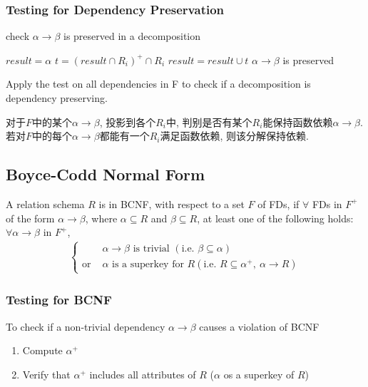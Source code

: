 \subsubsection{Testing for Dependency Preservation}

\begin{algorithm}[H]
    \caption{check $\alpha \rightarrow \beta$ is preserved in a decomposition}
    \begin{algorithmic}
        \State $result=\alpha$
                \State $t=(result\cap R_i)^+ \cap R_i$
            \EndFor
            \State $result=result\cup t$
                \State $\alpha \rightarrow \beta$ is preserved
            \EndIf
        \EndWhile
    \end{algorithmic}
\end{algorithm}
Apply the test on all dependencies in F to check if a decomposition is dependency preserving.


对于$F$中的某个$\alpha\rightarrow\beta$, 投影到各个$R_i$中, 判别是否有某个$R_i$能保持函数依赖$\alpha\rightarrow\beta$. 若对$F$中的每个$\alpha\rightarrow\beta$都能有一个$R_i$满足函数依赖, 则该分解保持依赖.

\subsection{Boyce-Codd Normal Form}
\begin{definition}
    A relation schema $R$ is in BCNF, with respect to a set $F$ of FDs, if $\forall$ FDs in $F^+$ of the form $\alpha \rightarrow \beta$, where $\alpha \subseteq R$ and $\beta \subseteq R$, at least one of the following holds: $\forall \alpha \rightarrow \beta$ in $F^+$, 
    \begin{align*}
        \left\{\begin{array}{rl}
            & \alpha\rightarrow \beta \text{ is trivial }(\text{i.e. }\beta \subseteq \alpha)\\
            \text{or }&\alpha \text{ is a superkey for } R (\text{i.e. } R\subseteq \alpha^+,\ \alpha \rightarrow R)
        \end{array}\right.
    \end{align*}
\end{definition}

\subsubsection{Testing for BCNF}
To check if a non-trivial dependency $\alpha\rightarrow\beta$ causes a violation of BCNF
\begin{enumerate}\small
    \item Compute $\alpha^+$
    \item Verify that $\alpha^+$ includes all attributes of $R$ ($\alpha$ os a superkey of $R$)
\end{enumerate}

